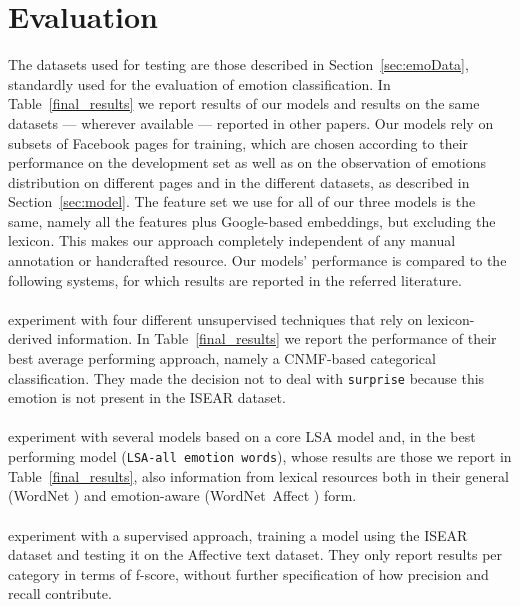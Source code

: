 \documentclass[11pt]{article}
\begin{document}


\section{Evaluation}
\label{sec:evaluation}
The datasets used for testing are those described in Section~\ref{sec:emoData}, standardly used for the evaluation of emotion classification.
In Table~\ref{final_results} we report results of our models and results on the same datasets --- wherever available --- reported in other papers. Our models rely on subsets of Facebook pages for training, which are chosen according to their performance on the development set as well as on the observation of emotions distribution on different pages and in the different datasets, as described in Section~\ref{sec:model}. The feature set we use for all of our three models is the same, namely all the features plus Google-based embeddings, but excluding the lexicon. This makes our approach completely independent of any manual annotation or handcrafted resource. Our models' performance is compared to the following systems, for which results are reported in the referred literature. 


\paragraph{} experiment with four different unsupervised techniques that rely on lexicon-derived information. In Table~\ref{final_results} we report the performance of their best average performing approach, namely a CNMF-based categorical classification. They made the decision not to deal with \texttt{surprise} because this emotion is not present in the ISEAR dataset.

\paragraph{} experiment with several models based on a core LSA model and, in the best performing model (\texttt{LSA-all emotion words}), whose results are those we report in Table~\ref{final_results}, also information from lexical resources both in their general (WordNet \cite{wordnet}) and emotion-aware (WordNet~Affect \cite{strapparava2004wordnet}) form. 

\paragraph{} experiment with a supervised approach, training a model using the ISEAR dataset and testing it on the Affective text dataset. They only report results per category in terms of f-score, without further specification of how precision and recall contribute.
\end{document}
